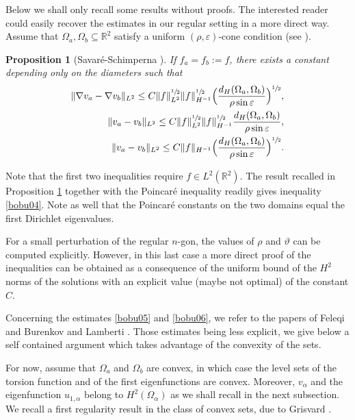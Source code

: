 \documentclass[11pt]{article}
\numberwithin{equation}{section}\newtheorem*{jepEnonce}{\jepEnonceTitle}\newenvironment{enonce*}[1]{\def\jepEnonceTitle{#1}\jepEnonce}{\endjepEnonce}\newtheorem*{conj*}{Conjecture}
\theoremstyle{plain}
\newtheorem{propo}[thm]{Proposition}
\theoremstyle{definition}
\def\R{\mathbb{R}}
\newcommand{\Om}{\Omega}
\newcommand{\sq}{\subseteq}
\let\jepOriginalSfrac\sfrac
\renewcommand{\sfrac}[2]{{\jepOriginalSfrac{#1}{#2}}}
\begin{document}
Below we shall only recall some results without proofs. The interested reader could easily recover the estimates in our regular setting in a more direct way.
Assume that $\Om_a, \Om_b\sq \R^2$ satisfy a uniform $(\rho, \varepsilon)$-cone condition (see \cite[Def.\,2.6]{SaSc02}).
\begin{propo}[Savaré-Schimperna \cite{SaSc02}]\label{bobu7} If $f_a=f_b:=f$, there exists a constant depending only on the diameters such that
\begin{align}\label{bobu03}
\|\nabla v_a- \nabla v_b\|_{L^2} \le C\|f\|_{L^2}^{\sfrac 12} \|f\|_{H^{-1} }^{\sfrac 12} \Big (\frac{d_H(\Om_a, \Om_b)}{\rho \sin \varepsilon}\Big)^{\sfrac 12},
\\
\label{bobu08}
\|v_a- v_b\|_{L^2} \le C\|f\|_{L^2}^{\sfrac 12} \|f\|_{H^{-1} }^{\sfrac 12} \frac{d_H(\Om_a, \Om_b)}{\rho \sin \varepsilon},
\\
\label{bobu30}
\|v_a- v_b\|_{L^2} \le C \|f\|_{H^{-1} } \Big (\frac{d_H(\Om_a, \Om_b)}{\rho \sin \varepsilon}\Big)^{\sfrac 12}.
\end{align}

\end{propo}
Note that the first two inequalities require $f\in L^2(\R^2)$. The result recalled in Proposition \ref{bobu7} together with the Poincaré inequality readily gives inequality \eqref{bobu04}. Note as well that the Poincaré constants on the two domains equal the first Dirichlet eigenvalues.

For a small perturbation of the regular $n$-gon, the values of $\rho$ and $\vartheta $ can be computed explicitly.
However, in this last case a more direct proof of the inequalities can be obtained as a consequence of the uniform bound of the $H^2$ norms of the solutions with an explicit value (maybe not optimal) of the constant $C$.

Concerning the estimates \eqref{bobu05} and \eqref{bobu06}, we refer to the papers of Feleqi \cite{FE16} and Burenkov and Lamberti \cite{BuLa12}. Those estimates being less explicit, we give below a self contained argument which takes advantage of the convexity of the sets.

For now, assume that $\Om_a$ and $\Om_b$ are convex, in which case the level sets of the torsion function and of the first eigenfunctions are convex. Moreover, $v_\alpha$ and the eigenfunction $u_{1,\alpha}$ belong to $H^2(\Om_\alpha)$ as we shall recall in the next subsection. We recall a first regularity result in the class of convex sets, due to Grisvard \cite[Th.\,3.1.2.1]{grisvard}.
\end{document}
